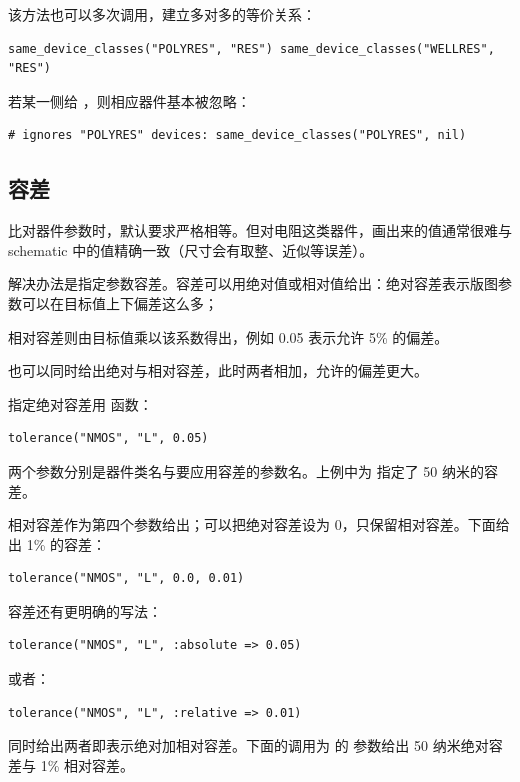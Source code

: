 该方法也可以多次调用，建立多对多的等价关系：

\begin{lstlisting}
same_device_classes("POLYRES", "RES") same_device_classes("WELLRES", "RES")
\end{lstlisting}

若某一侧给 ，则相应器件基本被忽略：

\begin{lstlisting}
# ignores "POLYRES" devices: same_device_classes("POLYRES", nil)
\end{lstlisting}

\subsection{容差}

比对器件参数时，默认要求严格相等。但对电阻这类器件，画出来的值通常很难与 schematic 中的值精确一致（尺寸会有取整、近似等误差）。

解决办法是指定参数容差。容差可以用绝对值或相对值给出：绝对容差表示版图参数可以在目标值上下偏差这么多；

相对容差则由目标值乘以该系数得出，例如 0.05 表示允许 5\% 的偏差。

也可以同时给出绝对与相对容差，此时两者相加，允许的偏差更大。

指定绝对容差用  函数：

\begin{lstlisting}
tolerance("NMOS", "L", 0.05)
\end{lstlisting}

两个参数分别是器件类名与要应用容差的参数名。上例中为  指定了 50 纳米的容差。

相对容差作为第四个参数给出；可以把绝对容差设为 0，只保留相对容差。下面给出 1\% 的容差：

\begin{lstlisting}
tolerance("NMOS", "L", 0.0, 0.01)
\end{lstlisting}

容差还有更明确的写法：

\begin{lstlisting}
tolerance("NMOS", "L", :absolute => 0.05)
\end{lstlisting}

或者：

\begin{lstlisting}
tolerance("NMOS", "L", :relative => 0.01)
\end{lstlisting}

同时给出两者即表示绝对加相对容差。下面的调用为  的  参数给出 50 纳米绝对容差与 1\% 相对容差。

